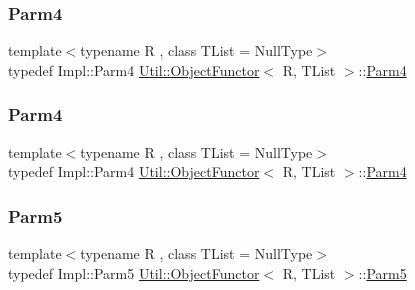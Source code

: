 \mbox{\label{classUtil_1_1ObjectFunctor_a54ce0b64981cd7f558ce8eea7df3f1b2}} 
\subsubsection{\texorpdfstring{Parm4}{Parm4}\hspace{0.1cm}{\footnotesize\ttfamily [1/2]}}
{\footnotesize\ttfamily template$<$typename R , class T\+List  = Null\+Type$>$ \\
typedef Impl\+::\+Parm4 \mbox{\hyperlink{classUtil_1_1ObjectFunctor}{Util\+::\+Object\+Functor}}$<$ R, T\+List $>$\+::\mbox{\hyperlink{classUtil_1_1ObjectFunctor_a54ce0b64981cd7f558ce8eea7df3f1b2}{Parm4}}}

\mbox{\label{classUtil_1_1ObjectFunctor_a54ce0b64981cd7f558ce8eea7df3f1b2}} 
\subsubsection{\texorpdfstring{Parm4}{Parm4}\hspace{0.1cm}{\footnotesize\ttfamily [2/2]}}
{\footnotesize\ttfamily template$<$typename R , class T\+List  = Null\+Type$>$ \\
typedef Impl\+::\+Parm4 \mbox{\hyperlink{classUtil_1_1ObjectFunctor}{Util\+::\+Object\+Functor}}$<$ R, T\+List $>$\+::\mbox{\hyperlink{classUtil_1_1ObjectFunctor_a54ce0b64981cd7f558ce8eea7df3f1b2}{Parm4}}}

\mbox{\label{classUtil_1_1ObjectFunctor_a8428e04dd3fb91bc7f7c518a1771eecb}} 
\subsubsection{\texorpdfstring{Parm5}{Parm5}\hspace{0.1cm}{\footnotesize\ttfamily [1/2]}}
{\footnotesize\ttfamily template$<$typename R , class T\+List  = Null\+Type$>$ \\
typedef Impl\+::\+Parm5 \mbox{\hyperlink{classUtil_1_1ObjectFunctor}{Util\+::\+Object\+Functor}}$<$ R, T\+List $>$\+::\mbox{\hyperlink{classUtil_1_1ObjectFunctor_a8428e04dd3fb91bc7f7c518a1771eecb}{Parm5}}}


